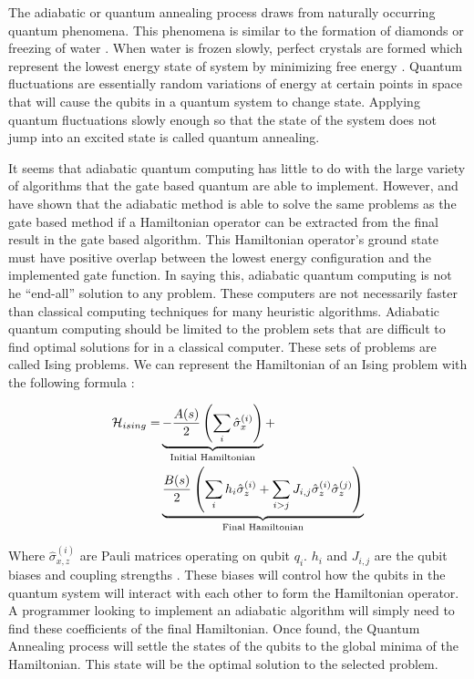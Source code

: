 \documentclass[conference]{IEEEtran}
\begin{document}
The adiabatic or quantum annealing process draws from naturally occurring quantum phenomena. This phenomena is similar to the formation of diamonds or freezing of water \cite{b1}. When water is frozen slowly, perfect crystals are formed which represent the lowest energy state of system by minimizing free energy \cite{b1}. Quantum fluctuations are essentially random variations of energy at certain points in space that will cause the qubits in a quantum system to change state. Applying quantum fluctuations slowly enough so that the state of the system does not jump into an excited state is called quantum annealing.

It seems that adiabatic quantum computing has little to do with the large variety of algorithms that the gate based quantum are able to implement. However, \cite{b12} and \cite{b10} have shown that the adiabatic method is able to solve the same problems as the gate based method if a Hamiltonian operator can be extracted from the final result in the gate based algorithm. This Hamiltonian operator's ground state must have positive overlap between the lowest energy configuration and the implemented gate function. In saying this, adiabatic quantum computing is not he ``end-all'' solution to any problem. These computers are not necessarily faster than classical computing techniques for many heuristic algorithms. Adiabatic quantum computing should be limited to the problem sets that are difficult to find optimal solutions for in a classical computer. These sets of problems are called Ising problems. We can represent the Hamiltonian of an Ising problem with the following formula \cite{b13}:

\begin{align*}
{\cal H}_{ising} = & \underbrace{- \frac{A({s})}{2} \left(\sum_i {\hat\sigma_{x}^{(i)}}\right)}_\text{Initial Hamiltonian} + \\
& \underbrace{\frac{B({s})}{2} \left(\sum_{i} h_i {\hat\sigma_{z}^{(i)}} + \sum_{i>j} J_{i,j} {\hat\sigma_{z}^{(i)}} {\hat\sigma_{z}^{(j)}}\right)}_\text{Final Hamiltonian}
\end{align*}

Where ${\hat\sigma_{x,z}^{(i)}}$ are Pauli matrices operating on qubit $q_i$. $h_i$ and $J_{i,j}$ are the qubit biases and coupling strengths \cite{b13}. These biases will control how the qubits in the quantum system will interact with each other to form the Hamiltonian operator. A programmer looking to implement an adiabatic algorithm will simply need to find these coefficients of the final Hamiltonian. Once found, the Quantum Annealing process will settle the states of the qubits to the global minima of the Hamiltonian. This state will be the optimal solution to the selected problem.
\end{document}
